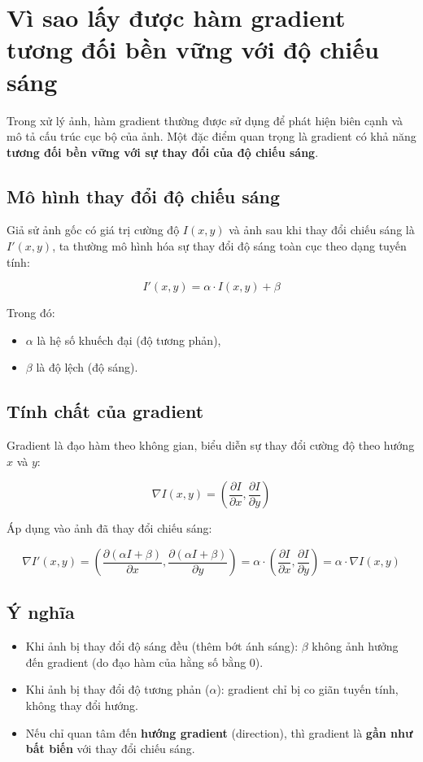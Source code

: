 \documentclass[12pt]{article}
\begin{document}
	\section{Vì sao lấy được hàm gradient tương đối bền vững với độ chiếu sáng}
	
	Trong xử lý ảnh, hàm gradient thường được sử dụng để phát hiện biên cạnh và mô tả cấu trúc cục bộ của ảnh. Một đặc điểm quan trọng là gradient có khả năng \textbf{tương đối bền vững với sự thay đổi của độ chiếu sáng}.
	
	\subsection{Mô hình thay đổi độ chiếu sáng}
	
	Giả sử ảnh gốc có giá trị cường độ $I(x, y)$ và ảnh sau khi thay đổi chiếu sáng là $I'(x, y)$, ta thường mô hình hóa sự thay đổi độ sáng toàn cục theo dạng tuyến tính:
	
	\[
	I'(x, y) = \alpha \cdot I(x, y) + \beta
	\]
	
	Trong đó:
	\begin{itemize}
		\item $\alpha$ là hệ số khuếch đại (độ tương phản),
		\item $\beta$ là độ lệch (độ sáng).
	\end{itemize}
	
	\subsection{Tính chất của gradient}
	
	Gradient là đạo hàm theo không gian, biểu diễn sự thay đổi cường độ theo hướng $x$ và $y$:
	
	\[
	\nabla I(x, y) = \left( \frac{\partial I}{\partial x}, \frac{\partial I}{\partial y} \right)
	\]
	
	Áp dụng vào ảnh đã thay đổi chiếu sáng:
	
	\[
	\nabla I'(x, y) = \left( \frac{\partial (\alpha I + \beta)}{\partial x}, \frac{\partial (\alpha I + \beta)}{\partial y} \right)
	= \alpha \cdot \left( \frac{\partial I}{\partial x}, \frac{\partial I}{\partial y} \right) = \alpha \cdot \nabla I(x, y)
	\]
	
	\subsection{Ý nghĩa}
	
	\begin{itemize}
		\item Khi ảnh bị thay đổi độ sáng đều (thêm bớt ánh sáng): $\beta$ không ảnh hưởng đến gradient (do đạo hàm của hằng số bằng 0).
		\item Khi ảnh bị thay đổi độ tương phản ($\alpha$): gradient chỉ bị co giãn tuyến tính, không thay đổi hướng.
		\item Nếu chỉ quan tâm đến \textbf{hướng gradient} (direction), thì gradient là \textbf{gần như bất biến} với thay đổi chiếu sáng.
	\end{itemize}
	
\end{document}
